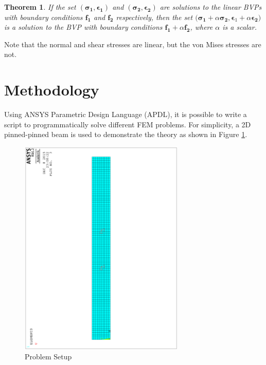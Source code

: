 \documentclass[letterpaper,12pt,]{article}
\begin{document}
\newtheorem{theorem}{Theorem}
\begin{theorem}
If the set $(\boldsymbol{\sigma_{1}}, \boldsymbol{\epsilon_{1}})$ and $(\boldsymbol{\sigma_{2}}, \boldsymbol{\epsilon_{2}})$ are solutions to the linear BVPs with boundary conditions $\mathbf{f_{1}}$ and $\mathbf{f_{2}}$ respectively, then the set $\boldsymbol{(\sigma_{1}} + \alpha\boldsymbol{\sigma_{2}}, \boldsymbol\epsilon_{1}+\alpha\boldsymbol{\epsilon_{2}})$ is a solution to the BVP with boundary conditions $\mathbf{f_{1}} + \alpha \mathbf{f_{2}}$, where $\alpha$ is a scalar.
\label{th:pos}
\end{theorem}

Note that the normal and shear stresses are linear, but the von Mises stresses are not.

\section*{Methodology}

Using ANSYS Parametric Design Language (APDL), it is possible to write a script to programmatically solve different FEM problems. For simplicity, a 2D pinned-pinned beam is used to demonstrate the theory as shown in Figure \ref{fig:pdef}.

\begin{figure}[h]
\centering
\includegraphics[width=0.7\textwidth,angle=-90]{pdef002.eps}
\caption{Problem Setup}
\label{fig:pdef}
\end{figure}
\end{document}

